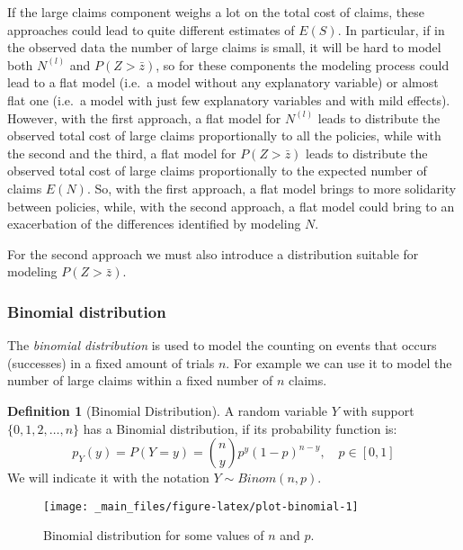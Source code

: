 \documentclass[a4paper, twoside, openright, 12pt]{report}
\theoremstyle{definition}
\newtheorem{definition}{Definition}[chapter]
\theoremstyle{definition}
\theoremstyle{definition}
\theoremstyle{remark}
\begin{document}
If the large claims component weighs a lot on the total cost of claims, these approaches could lead to quite different estimates of \(E(S)\). In particular, if in the observed data the number of large claims is small, it will be hard to model both \(N^{(l)}\) and \(P(Z>\bar{z})\), so for these components the modeling process could lead to a flat model (i.e.~a model without any explanatory variable) or almost flat one (i.e.~a model with just few explanatory variables and with mild effects). However, with the first approach, a flat model for \(N^{(l)}\) leads to distribute the observed total cost of large claims proportionally to all the policies, while with the second and the third, a flat model for \(P(Z>\bar{z})\) leads to distribute the observed total cost of large claims proportionally to the expected number of claims \(E(N)\). So, with the first approach, a flat model brings to more solidarity between policies, while, with the second approach, a flat model could bring to an exacerbation of the differences identified by modeling \(N\).

For the second approach we must also introduce a distribution suitable for modeling \(P(Z>\bar{z})\).

\hypertarget{binomial-distribution}{%
\subsubsection{Binomial distribution}\label{binomial-distribution}}

The \emph{binomial distribution} is used to model the counting on events that occurs (successes) in a fixed amount of trials \(n\). For example we can use it to model the number of large claims within a fixed number of \(n\) claims.

\begin{definition}[Binomial Distribution]
\label{def:def-binomial} \iffalse (Binomial Distribution) \fi{} A random variable \(Y\) with support \(\{0,1,2, \dots, n \}\) has a Binomial distribution, if its probability function is:
\[
p_Y(y) = P\left( Y = y \right) = \binom{n}{y} p^y (1-p)^{n-y}, \quad p \in [0, 1]
\]
We will indicate it with the notation \(Y \sim Binom(n, p)\).
\end{definition}

\begin{figure}[!hbtp]

{\centering \texttt{[image: \_main\_files/figure-latex/plot-binomial-1]} 

}

\caption{Binomial distribution for some values of $n$ and $p$.}\label{fig:plot-binomial}
\end{figure}
\end{document}
